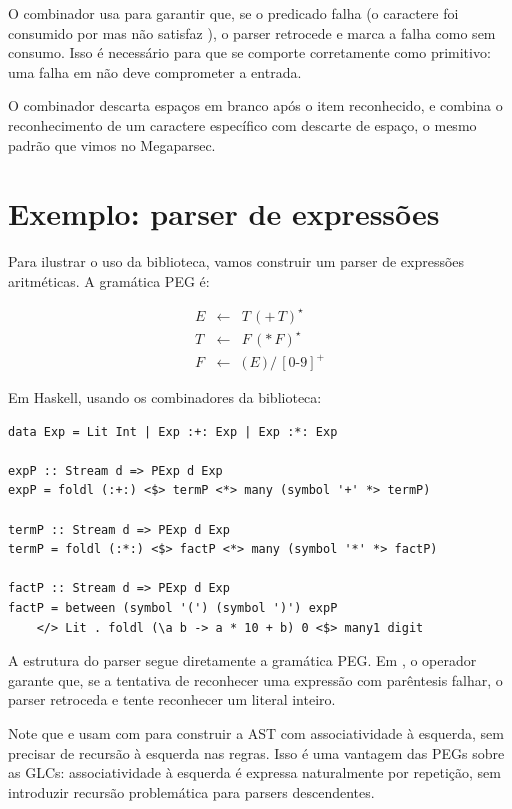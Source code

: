 O combinador  usa
 para garantir que, se o predicado falha
(o caractere foi consumido por  mas
não satisfaz ), o parser retrocede e marca
a falha como sem consumo. Isso é necessário para que
 se comporte corretamente como
primitivo: uma falha em  não deve
comprometer a entrada.

O combinador  descarta espaços em
branco após o item reconhecido, e 
combina o reconhecimento de um caractere específico com descarte de
espaço, o mesmo padrão que vimos no Megaparsec.

\section{Exemplo: parser de expressões}

Para ilustrar o uso da biblioteca, vamos construir um parser de
expressões aritméticas. A gramática PEG é:

\[
  \begin{array}{lcl}
    E & \leftarrow & T\, (\texttt{+}\, T)^\star\\
    T & \leftarrow & F\,(*\, F)^\star\\
    F & \leftarrow & \texttt{(}\, E\, \texttt{)} \,/\, [0\text{-}9]^+
  \end{array}
\]

Em Haskell, usando os combinadores da biblioteca:

\begin{verbatim}
data Exp = Lit Int | Exp :+: Exp | Exp :*: Exp

expP :: Stream d => PExp d Exp
expP = foldl (:+:) <$> termP <*> many (symbol '+' *> termP)

termP :: Stream d => PExp d Exp
termP = foldl (:*:) <$> factP <*> many (symbol '*' *> factP)

factP :: Stream d => PExp d Exp
factP = between (symbol '(') (symbol ')') expP
    </> Lit . foldl (\a b -> a * 10 + b) 0 <$> many1 digit
\end{verbatim}

A estrutura do parser segue diretamente a gramática PEG. Em
, o operador
\haskell{</>} garante que, se a tentativa de
reconhecer uma expressão com parêntesis falhar, o parser retroceda e
tente reconhecer um literal inteiro.

Note que  e
 usam 
com  para construir a AST com
associatividade à esquerda, sem precisar de recursão à esquerda nas
regras. Isso é uma vantagem das PEGs sobre as GLCs: associatividade à
esquerda é expressa naturalmente por repetição, sem introduzir
recursão problemática para parsers descendentes.

